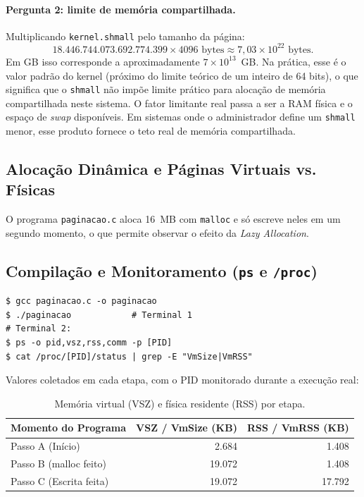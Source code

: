 \documentclass[11pt,a4paper]{article}
\begin{document}
\paragraph{Pergunta 2: limite de memória compartilhada.}
Multiplicando \texttt{kernel.shmall} pelo tamanho da página:
\[
18.446.744.073.692.774.399 \times 4096 \text{ bytes} \approx 7{,}03 \times 10^{22} \text{ bytes}.
\]
Em GB isso corresponde a aproximadamente $7 \times 10^{13}$~GB. Na prática, esse é o valor padrão do
kernel (próximo do limite teórico de um inteiro de 64 bits), o que significa que o \texttt{shmall}
não impõe limite prático para alocação de memória compartilhada neste sistema. O fator limitante
real passa a ser a RAM física e o espaço de \emph{swap} disponíveis. Em sistemas onde o administrador
define um \texttt{shmall} menor, esse produto fornece o teto real de memória compartilhada.

\subsection{Alocação Dinâmica e Páginas Virtuais vs. Físicas}

O programa \texttt{paginacao.c} aloca 16~MB com \texttt{malloc} e só escreve neles em um segundo
momento, o que permite observar o efeito da \emph{Lazy Allocation}.



\subsection{Compilação e Monitoramento (\texttt{ps} e \texttt{/proc})}

\begin{lstlisting}[style=bashstyle]
$ gcc paginacao.c -o paginacao
$ ./paginacao            # Terminal 1
# Terminal 2:
$ ps -o pid,vsz,rss,comm -p [PID]
$ cat /proc/[PID]/status | grep -E "VmSize|VmRSS"
\end{lstlisting}

Valores coletados em cada etapa, com o PID monitorado durante a execução real:

\begin{table}[h]
\centering
\begin{tabular}{lrr}
\toprule
Momento do Programa & VSZ / VmSize (KB) & RSS / VmRSS (KB) \\
\midrule
Passo A (Início)        & 2.684  & 1.408 \\
Passo B (malloc feito)  & 19.072 & 1.408 \\
Passo C (Escrita feita) & 19.072 & 17.792 \\
\bottomrule
\end{tabular}
\caption{Memória virtual (VSZ) e física residente (RSS) por etapa.}
\end{table}
\end{document}

